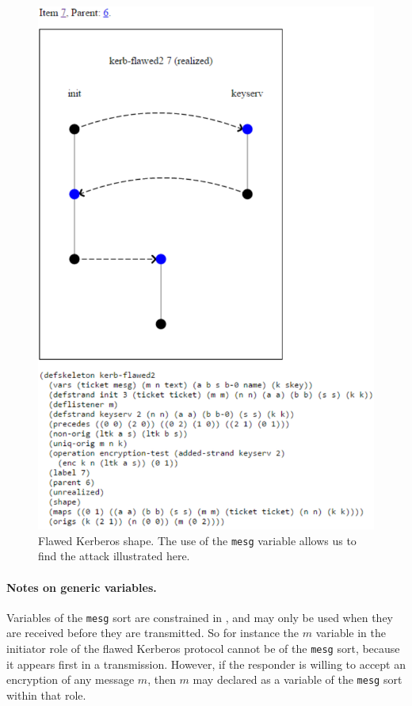 \begin{figure}
\centering
\includegraphics[scale=0.8]{kerb_skel7}
\caption[Flawed Kerberos shape]{Flawed Kerberos shape.  The use of the \texttt{mesg} variable allows us to find the attack illustrated here.}
\label{fig:kerb-skel7}
\end{figure}

\paragraph{Notes on generic variables.}
Variables of the \texttt{mesg} sort are constrained in {\cpsa}, and
may only be used when they are received before they are transmitted.
So for instance the $m$ variable in the initiator role of the flawed
Kerberos protocol cannot be of the \texttt{mesg} sort, because it
appears first in a transmission. However, if the responder is willing
to accept an encryption of any message $m$, then $m$ may declared as a
variable of the \texttt{mesg} sort within that role.

